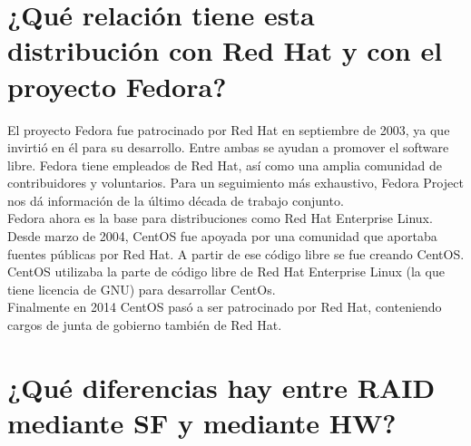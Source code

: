 	
	\section{¿Qué relación tiene esta distribución con Red Hat y con el proyecto Fedora?}
	
	El proyecto Fedora\cite{once} fue patrocinado por Red Hat en septiembre de 2003, ya que invirtió en él para su desarrollo. Entre ambas se ayudan a promover el software libre. Fedora tiene empleados de Red Hat, así como una amplia comunidad de contribuidores y voluntarios. Para un seguimiento más exhaustivo, Fedora Project\cite{doce} nos dá información de la último década de trabajo conjunto.
	\\
	
	Fedora ahora es la base para distribuciones como Red Hat Enterprise Linux.
	Desde marzo de 2004, CentOS\cite{trece,catorce} fue apoyada por una comunidad que aportaba fuentes públicas por Red Hat. A partir de ese código libre se fue creando CentOS.
	\\
	
	CentOS utilizaba la parte de código libre de Red Hat Enterprise Linux (la que tiene licencia de GNU) para desarrollar CentOs.
	\\
	
	Finalmente en 2014 CentOS pasó a ser patrocinado por Red Hat, conteniendo cargos de junta de gobierno también de Red Hat.
	
	
	
	\section{¿Qué diferencias hay entre RAID mediante SF y mediante HW?}
	
